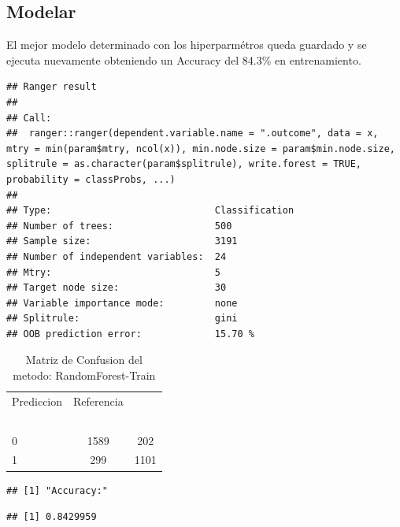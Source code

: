 \documentclass[]{article}
\begin{document}
\hypertarget{modelar-5}{%
\subsection{Modelar}\label{modelar-5}}

El mejor modelo determinado con los hiperparmétros queda guardado y se
ejecuta nuevamente obteniendo un Accuracy del 84.3\% en entrenamiento.

\begin{lstlisting}
## Ranger result
## 
## Call:
##  ranger::ranger(dependent.variable.name = ".outcome", data = x,      mtry = min(param$mtry, ncol(x)), min.node.size = param$min.node.size,      splitrule = as.character(param$splitrule), write.forest = TRUE,      probability = classProbs, ...) 
## 
## Type:                             Classification 
## Number of trees:                  500 
## Sample size:                      3191 
## Number of independent variables:  24 
## Mtry:                             5 
## Target node size:                 30 
## Variable importance mode:         none 
## Splitrule:                        gini 
## OOB prediction error:             15.70 %
\end{lstlisting}

\begin{table}[!h]

\caption{\label{tab:MatrizConf_RandomForest-Train}Matriz de Confusion del metodo: RandomForest-Train }
\centering
\begin{tabular}[t]{lcc}
\toprule
\multicolumn{1}{c}{Prediccion} & \multicolumn{1}{c}{Referencia} & \multicolumn{1}{c}{ } \\
\cmidrule(l{3pt}r{3pt}){1-1} \cmidrule(l{3pt}r{3pt}){2-2}
\rowcolor{black}  \multicolumn{1}{c}{\textcolor{white}{\textbf{ }}} & \multicolumn{1}{c}{\textcolor{white}{\textbf{0}}} & \multicolumn{1}{c}{\textcolor{white}{\textbf{1}}}\\
\midrule
\rowcolor{gray!6}  0 & 1589 & 202\\
1 & 299 & 1101\\
\bottomrule
\end{tabular}
\end{table}

\begin{lstlisting}
## [1] "Accuracy:"
\end{lstlisting}

\begin{lstlisting}
## [1] 0.8429959
\end{lstlisting}
\end{document}
